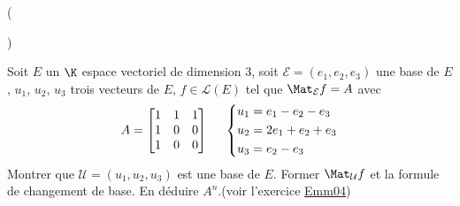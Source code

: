 \begin{tiny}()\end{tiny}
Soit $E$ un $\K$ espace vectoriel de dimension $3$, soit $\mathcal E=(e_1,e_2,e_3)$ une base de $E$, $u_1$, $u_2$, $u_3$ trois vecteurs de $E$, $f\in \mathcal L(E)$ tel que $\Mat_{\mathcal E}f=A$ avec
\begin{displaymath}
A=
 \begin{bmatrix}
  1 & 1 & 1 \\
1 & 0 & 0 \\
1 & 0 & 0
 \end{bmatrix}
\hspace{0.5cm}
\left\lbrace 
\begin{aligned}
 u_1 &= e_1 -e_2 -e_3 \\
 u_2 &= 2e_1 +e_2 +e_3 \\
 u_3 &= e_2 - e_3
\end{aligned}
\right. 
\end{displaymath}
Montrer que $\mathcal U =(u_1,u_2,u_3)$ est une base de $E$. Former $\Mat_{\mathcal U}f$ et la formule de changement de base. En déduire $A^n$.(voir l'exercice \hyperref{\baseurl temptex/fexmm.pdf}{exo}{Emm04}{Emm04})
